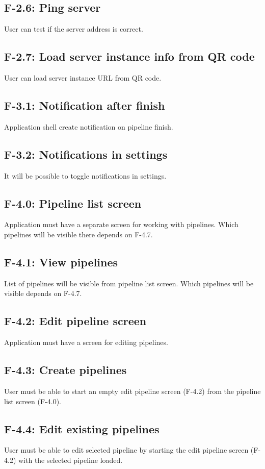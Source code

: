 \subsection*{F-2.6: Ping server}
\label{subsec:ping}
User can test if the server address is correct.
\subsection*{F-2.7: Load server instance info from QR code}
\label{subsec:qrcode}
User can load server instance URL from QR code.
\subsection*{F-3.1: Notification after finish }
\label{subsec:notifications}
Application shell create notification on pipeline finish.
\subsection*{F-3.2: Notifications in settings}
It will be possible to toggle notifications in settings.
\subsection*{F-4.0: Pipeline list screen}
Application must have a separate screen for working with pipelines. Which pipelines will be visible there depends on F-4.7.
\subsection*{F-4.1: View pipelines}
List of pipelines will be visible from pipeline list screen. Which pipelines will be visible depends on F-4.7.
\subsection*{F-4.2: Edit pipeline screen}
\label{subsec:editpipelinescreen}
Application must have a screen for editing pipelines.
\subsection*{F-4.3: Create pipelines}
User must be able to start an empty edit pipeline screen (F-4.2) from the pipeline list screen (F-4.0).
\subsection*{F-4.4: Edit existing pipelines}
User must be able to edit selected pipeline by starting the edit pipeline screen (F-4.2) with the selected pipeline loaded.
